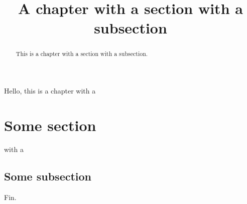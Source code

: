 \documentclass{ximera}
\title{A chapter with a section with a subsection}
\begin{document}
\begin{abstract}
  This is a chapter with a section with a subsection.
\end{abstract}
\maketitle




Hello, this is a chapter with a

\section{Some section}

with a

\subsection{Some subsection}
Fin.
\end{document}
